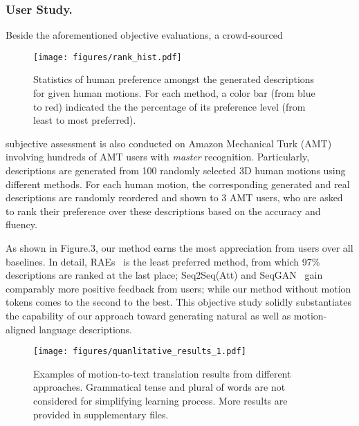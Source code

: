 \documentclass[runningheads]{llncs}
\newcommand{\beforefigcaption}{\vspace{-9mm}}
\newcommand{\afterfigcaption}{\vspace{-5mm}}
\newcommand{\beforesubsubsection}{\vspace{-5mm}}
\begin{document}
\subsubsection{User Study.} Beside the aforementioned objective evaluations, a crowd-sourced
\begin{wrapfigure}{r}{0.5\textwidth}
          \vspace{-2em}
  \begin{center}
    \texttt{[image: figures/rank\_hist.pdf]}
  \end{center}
  \beforefigcaption
  \label{fig:rank_hist}
  \caption{Statistics of human preference amongst the generated descriptions for given human motions. For each method, a color bar (from blue to red) indicated the the percentage of its preference level (from least to most preferred).}
  \afterfigcaption
\end{wrapfigure}
 subjective assessment is also conducted on Amazon Mechanical Turk (AMT) involving hundreds of AMT users with \textit{master} recognition. Particularly, descriptions are generated from 100 randomly selected 3D human motions using different methods. For each human motion, the corresponding generated and real descriptions are randomly reordered and shown to 3 AMT users, who are asked to rank their preference over these descriptions based on the accuracy and fluency. 

As shown in Figure.3, our method earns the most appreciation from users over all baselines. In detail, RAEs~\cite{yamada2018paired} is the least preferred method, from which 97\% descriptions are ranked at the last place; Seq2Seq(Att) and SeqGAN~\cite{goutsu2021linguistic} gain comparably more positive feedback from users; while our method without motion tokens comes to the second to the best. This objective study solidly substantiates the capability of our approach toward generating natural as well as motion-aligned language descriptions.

\begin{figure*}[t]
	\centering
	\texttt{[image: figures/quanlitative\_results\_1.pdf]}
		 \beforefigcaption
	\caption{Examples of motion-to-text translation results from different approaches. Grammatical tense and plural of words are not considered for simplifying learning process. More results are provided in supplementary files.}
	\label{fig:qualit_motion_to_text}
	 \afterfigcaption
\end{figure*}

\beforesubsubsection
\end{document}
